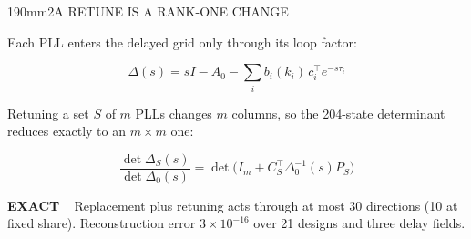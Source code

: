 \begin{DensePanel}{190mm}{2}{A RETUNE IS A RANK-ONE CHANGE}
  {\DenseBody Each PLL enters the delayed grid only through its loop factor:\par}
  {\DenseEq\color{IASBlue}\[
    \Delta(s)=sI-A_0-\sum_i b_i(k_i)\,c_i^{\top}e^{-s\tau_i}
  \]}
  \vspace{-2mm}
  {\DenseBody Retuning a set $S$ of $m$ PLLs changes $m$ columns, so the 204-state determinant reduces exactly to an $m\times m$ one:\par}
  {\DenseEq\color{IASBlue}\[
    \frac{\det\Delta_S(s)}{\det\Delta_0(s)}=\det\!\big(I_m+C_S^{\top}\Delta_0^{-1}(s)P_S\big)
  \]}
  \vspace{-1mm}
  \begin{DenseWords}\textbf{\color{IASGold!65!black}EXACT\ \ }Replacement plus retuning acts through at most 30 directions (10 at fixed share). Reconstruction error $3\times10^{-16}$ over 21 designs and three delay fields.\end{DenseWords}
\end{DensePanel}
